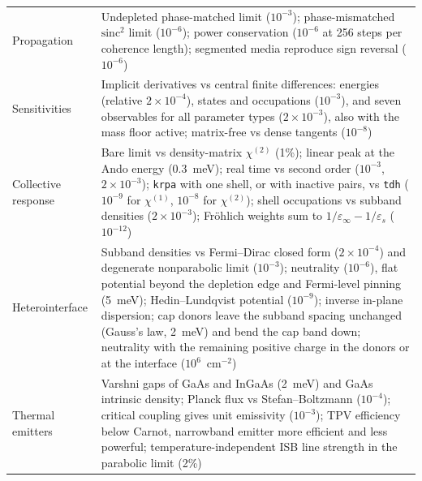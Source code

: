 \documentclass[11pt]{article}
\newcommand{\chitwo}{\chi^{(2)}}
\newcommand{\code}[1]{\texttt{#1}}
\begin{document}
\begin{table}[tp]
\begin{tabularx}{\textwidth}{@{}lX@{}}
Propagation & Undepleted phase-matched limit ($10^{-3}$); phase-mismatched $\mathrm{sinc}^2$ limit ($10^{-6}$); power conservation ($10^{-6}$ at 256 steps per coherence length); segmented media reproduce sign reversal ($10^{-6}$) \\
Sensitivities & Implicit derivatives vs central finite differences: energies (relative $2\times10^{-4}$), states and occupations ($10^{-3}$), and seven observables for all parameter types ($2\times10^{-3}$), also with the mass floor active; matrix-free vs dense tangents ($10^{-8}$) \\
Collective response & Bare limit vs density-matrix $\chitwo$ (1\%); linear peak at the Ando energy (0.3~meV); real time vs second order ($10^{-3}$, $2\times10^{-3}$); \code{krpa} with one shell, or with inactive pairs, vs \code{tdh} ($10^{-9}$ for $\chi^{(1)}$, $10^{-8}$ for $\chitwo$); shell occupations vs subband densities ($2\times10^{-3}$); Fr\"ohlich weights sum to $1/\varepsilon_\infty-1/\varepsilon_s$ ($10^{-12}$) \\
Heterointerface & Subband densities vs Fermi--Dirac closed form ($2\times10^{-4}$) and degenerate nonparabolic limit ($10^{-3}$); neutrality ($10^{-6}$), flat potential beyond the depletion edge and Fermi-level pinning (5~meV); Hedin--Lundqvist potential ($10^{-9}$); inverse in-plane dispersion; cap donors leave the subband spacing unchanged (Gauss's law, 2~meV) and bend the cap band down; neutrality with the remaining positive charge in the donors or at the interface ($10^{6}$~cm$^{-2}$) \\
Thermal emitters & Varshni gaps of GaAs and InGaAs (2~meV) and GaAs intrinsic density; Planck flux vs Stefan--Boltzmann ($10^{-4}$); critical coupling gives unit emissivity ($10^{-3}$); TPV efficiency below Carnot, narrowband emitter more efficient and less powerful; temperature-independent ISB line strength in the parabolic limit (2\%) \\ \bottomrule
\end{tabularx}
\end{table}
\end{document}
